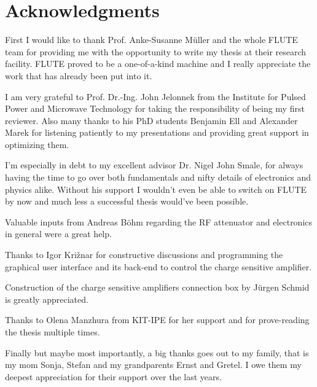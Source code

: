 \chapter*{Acknowledgments}

First I would like to thank Prof. Anke-Susanne Müller and the whole FLUTE team for providing me with the opportunity to write my thesis at their research facility. FLUTE proved to be a one-of-a-kind machine and I really appreciate the work that has already been put into it.

I am very grateful to Prof. Dr.-Ing. John Jelonnek from the Institute for Pulsed Power and Microwave Technology for taking the responsibility of being my first reviewer. Also many thanks to his PhD students Benjamin Ell and Alexander Marek for listening patiently to my presentations and providing great support in optimizing them. 

I'm especially in debt to my excellent advisor Dr. Nigel John Smale, for always having the time to go over both fundamentals and nifty details of electronics and physics alike. Without his support I wouldn't even be able to switch on FLUTE by now and much less a successful thesis would've been possible.

Valuable inputs from Andreas Böhm regarding the RF attenuator and electronics in general were a great help.

Thanks to Igor Križnar for constructive discussions and programming the graphical user interface and its back-end to control the charge sensitive amplifier.

Construction of the charge sensitive amplifiers connection box by Jürgen Schmid is greatly appreciated.

Thanks to Olena Manzhura from KIT-IPE for her support and for prove-reading the thesis multiple times.

Finally but maybe most importantly, a big thanks goes out to my family, that is my mom Sonja, Stefan and my grandparents Ernst and Gretel. I owe them my deepest appreciation for their support over the last years.
